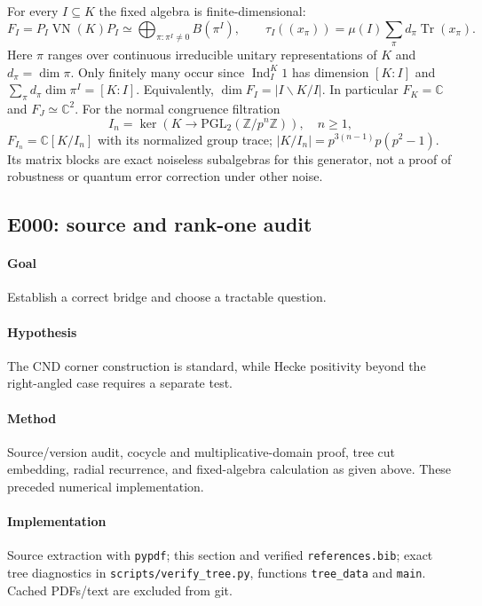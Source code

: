 \documentclass[11pt]{article}
\theoremstyle{remark}\newtheorem{remark}[definition]{Remark}
\newcommand{\VN}{\operatorname{VN}}
\newcommand{\Tr}{\operatorname{Tr}}
\newcommand{\C}{\mathbb{C}}
\newcommand{\Z}{\mathbb{Z}}
\begin{document}
For every $I\subseteq K$ the fixed algebra is finite-dimensional:
\[
 F_I=P_I\VN(K)P_I
 \simeq\bigoplus_{\pi:\pi^I\ne0}B(\pi^I),\qquad
 \tau_I((x_\pi))=\mu(I)\sum_\pi d_\pi\Tr(x_\pi).
\]
Here $\pi$ ranges over continuous irreducible unitary representations of
$K$ and $d_\pi=\dim\pi$. Only finitely many occur since
$\operatorname{Ind}_I^K1$ has dimension $[K:I]$ and
$\sum_\pi d_\pi\dim\pi^I=[K:I]$. Equivalently,
$\dim F_I=|I\backslash K/I|$. In particular $F_K=\C$ and
$F_J\simeq\C^2$. For the normal congruence filtration
\[
 I_n=\ker(K\longrightarrow\mathrm{PGL}_2(\Z/p^n\Z)),\quad n\geq1,
\]
$F_{I_n}=\C[K/I_n]$ with its normalized group trace;
$|K/I_n|=p^{3(n-1)}p(p^2-1)$. Its matrix blocks are exact noiseless
subalgebras for this generator, not a proof of robustness or quantum error
correction under other noise.

\subsection{E000: source and rank-one audit}
\paragraph{Goal} Establish a correct bridge and choose a tractable question.
\paragraph{Hypothesis} The CND corner construction is standard, while Hecke
positivity beyond the right-angled case requires a separate test.
\paragraph{Method} Source/version audit, cocycle and multiplicative-domain
proof, tree cut embedding, radial recurrence, and fixed-algebra calculation
as given above. These preceded numerical implementation.
\paragraph{Implementation} Source extraction with \texttt{pypdf}; this
section and verified \texttt{references.bib}; exact tree diagnostics in
\texttt{scripts/verify\_tree.py}, functions \texttt{tree\_data} and
\texttt{main}. Cached PDFs/text are excluded from git.
\end{document}
